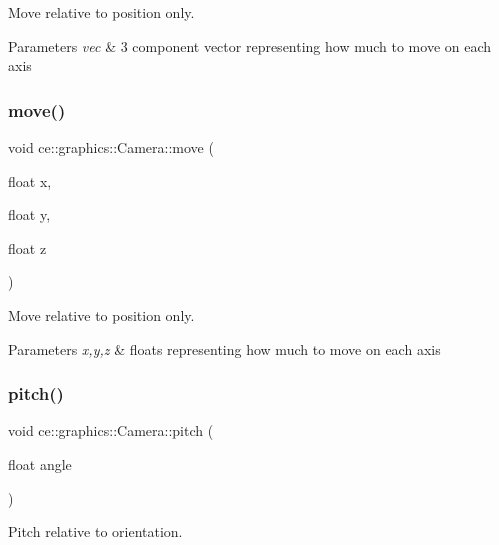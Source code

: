Move relative to position only. 


\begin{DoxyParams}{Parameters}
{\em vec} & 3 component vector representing how much to move on each axis \\
\hline
\end{DoxyParams}
\mbox{\label{classce_1_1graphics_1_1_camera_ae1f4306dcc5622eccc111c00404633df}} 
\subsubsection{\texorpdfstring{move()}{move()}\hspace{0.1cm}{\footnotesize\ttfamily [2/2]}}
{\footnotesize\ttfamily void ce\+::graphics\+::\+Camera\+::move (\begin{DoxyParamCaption}\item[{float}]{x,  }\item[{float}]{y,  }\item[{float}]{z }\end{DoxyParamCaption})}



Move relative to position only. 


\begin{DoxyParams}{Parameters}
{\em x,y,z} & floats representing how much to move on each axis \\
\hline
\end{DoxyParams}
\mbox{\label{classce_1_1graphics_1_1_camera_a43da1012113750cc0576b235e9b26013}} 
\subsubsection{\texorpdfstring{pitch()}{pitch()}}
{\footnotesize\ttfamily void ce\+::graphics\+::\+Camera\+::pitch (\begin{DoxyParamCaption}\item[{float}]{angle }\end{DoxyParamCaption})}



Pitch relative to orientation. 


